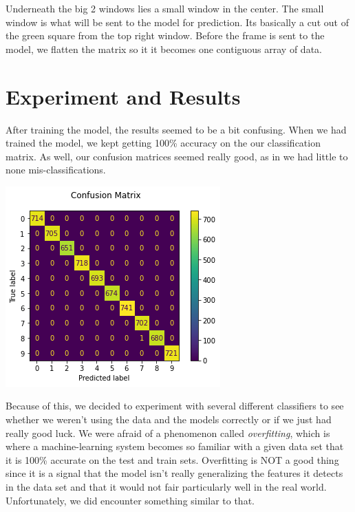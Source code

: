 \documentclass[letterpaper]{article} %
\begin{document}
Underneath the big 2 windows lies a small window in the center. The small window is what will be sent to the model for prediction. Its basically a cut out of the green square from the top right window. Before the frame is sent to the model, we flatten the matrix so it it becomes one contiguous array of data.


\section{Experiment and Results}

After training the model, the results seemed to be a bit confusing. When we had trained the model, we kept getting 100\% accuracy on the our classification matrix. As well, our confusion matrices seemed really good, as in we had little to none mis-classifications.

\includegraphics[scale=0.7]{complex-rfc-confusion}

Because of this, we decided to experiment with several different classifiers to see whether we weren't using the data and the models correctly or if we just had really good luck. We were afraid of a phenomenon called \textit{overfitting}, which is where a machine-learning system becomes so familiar with a given data set that it is 100\% accurate on the test and train sets. Overfitting is NOT a good thing since it is a signal that the model isn't really generalizing the features it detects in the data set and that it would not fair particularly well in the real world. Unfortunately, we did encounter something similar to that.
\\
\end{document}

